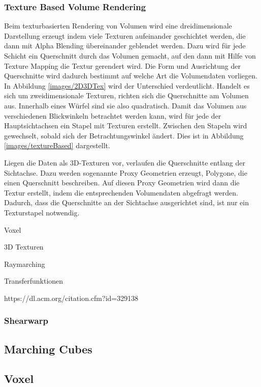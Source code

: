 \subsubsection{Texture Based Volume Rendering}

Beim texturbasierten Rendering von Volumen wird eine dreidimensionale Darstellung erzeugt indem viele Texturen aufeinander geschichtet werden, die dann mit Alpha Blending übereinander geblendet werden. Dazu wird für jede Schicht ein Querschnitt durch das Volumen gemacht, auf den dann mit Hilfe von Texture Mapping die Textur gerendert wird.
Die Form und Ausrichtung der Querschnitte wird dadurch bestimmt auf welche Art die Volumendaten vorliegen. In Abbildung \ref{images/2D3DTex} wird der Unterschied verdeutlicht. Handelt es sich um zweidimensionale Texturen,  richten sich die Querschnitte am Volumen aus. Innerhalb eines Würfel sind sie also quadratisch. Damit das Volumen aus verschiedenen Blickwinkeln betrachtet werden kann, wird für jede der Hauptsichtachsen ein Stapel mit Texturen erstellt. Zwischen den Stapeln wird gewechselt, sobald sich der Betrachtungswinkel ändert. Dies ist in Abbildung \ref{images/textureBased} dargestellt.

Liegen die Daten als 3D-Texturen vor, verlaufen die Querschnitte entlang der Sichtachse. Dazu werden sogenannte Proxy Geometrien erzeugt, Polygone, die einen Querschnitt beschreiben. Auf diesen Proxy Geometrien wird dann die Textur erstellt, indem die entsprechenden Volumendaten abgefragt werden. Dadurch, dass die Querschnitte an der Sichtachse ausgerichtet sind, ist nur ein Texturstapel notwendig. 

Voxel

3D Texturen

Raymarching

Transferfunktionen

https://dl.acm.org/citation.cfm?id=329138
\subsubsection{Shearwarp}

\subsection{Marching Cubes}

\subsection{Voxel}

